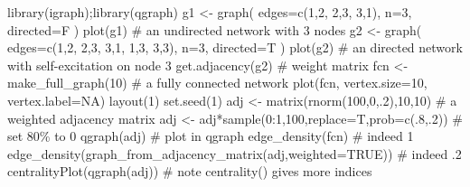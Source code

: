 \documentclass[
  a4paper,
  DIV=11,
  numbers=noendperiod]{scrreprt}
\newenvironment{Shaded}{\begin{snugshade}}{\end{snugshade}}
\newcommand{\AttributeTok}[1]{\textcolor[rgb]{0.40,0.45,0.13}{#1}}
\newcommand{\CommentTok}[1]{\textcolor[rgb]{0.37,0.37,0.37}{#1}}
\newcommand{\ConstantTok}[1]{\textcolor[rgb]{0.56,0.35,0.01}{#1}}
\newcommand{\DecValTok}[1]{\textcolor[rgb]{0.68,0.00,0.00}{#1}}
\newcommand{\FunctionTok}[1]{\textcolor[rgb]{0.28,0.35,0.67}{#1}}
\newcommand{\NormalTok}[1]{\textcolor[rgb]{0.00,0.23,0.31}{#1}}
\newcommand{\OtherTok}[1]{\textcolor[rgb]{0.00,0.23,0.31}{#1}}
\newcommand{\SpecialCharTok}[1]{\textcolor[rgb]{0.37,0.37,0.37}{#1}}
\begin{document}
\begin{Shaded}
\begin{Highlighting}[]
\FunctionTok{library}\NormalTok{(igraph);}\FunctionTok{library}\NormalTok{(qgraph)}
\NormalTok{g1 }\OtherTok{\textless{}{-}} \FunctionTok{graph}\NormalTok{( }\AttributeTok{edges=}\FunctionTok{c}\NormalTok{(}\DecValTok{1}\NormalTok{,}\DecValTok{2}\NormalTok{, }\DecValTok{2}\NormalTok{,}\DecValTok{3}\NormalTok{, }\DecValTok{3}\NormalTok{,}\DecValTok{1}\NormalTok{), }\AttributeTok{n=}\DecValTok{3}\NormalTok{, }\AttributeTok{directed=}\NormalTok{F ) }
\FunctionTok{plot}\NormalTok{(g1) }\CommentTok{\# an undirected network with 3 nodes}
\NormalTok{g2 }\OtherTok{\textless{}{-}} \FunctionTok{graph}\NormalTok{( }\AttributeTok{edges=}\FunctionTok{c}\NormalTok{(}\DecValTok{1}\NormalTok{,}\DecValTok{2}\NormalTok{, }\DecValTok{2}\NormalTok{,}\DecValTok{3}\NormalTok{, }\DecValTok{3}\NormalTok{,}\DecValTok{1}\NormalTok{, }\DecValTok{1}\NormalTok{,}\DecValTok{3}\NormalTok{, }\DecValTok{3}\NormalTok{,}\DecValTok{3}\NormalTok{), }\AttributeTok{n=}\DecValTok{3}\NormalTok{, }\AttributeTok{directed=}\NormalTok{T ) }
\FunctionTok{plot}\NormalTok{(g2) }\CommentTok{\# an directed network with self{-}excitation on node 3}
\FunctionTok{get.adjacency}\NormalTok{(g2) }\CommentTok{\# weight matrix}
\NormalTok{fcn }\OtherTok{\textless{}{-}} \FunctionTok{make\_full\_graph}\NormalTok{(}\DecValTok{10}\NormalTok{) }\CommentTok{\# a fully connected network}
\FunctionTok{plot}\NormalTok{(fcn, }\AttributeTok{vertex.size=}\DecValTok{10}\NormalTok{, }\AttributeTok{vertex.label=}\ConstantTok{NA}\NormalTok{)}
\FunctionTok{layout}\NormalTok{(}\DecValTok{1}\NormalTok{)}
\FunctionTok{set.seed}\NormalTok{(}\DecValTok{1}\NormalTok{)}
\NormalTok{adj }\OtherTok{\textless{}{-}} \FunctionTok{matrix}\NormalTok{(}\FunctionTok{rnorm}\NormalTok{(}\DecValTok{100}\NormalTok{,}\DecValTok{0}\NormalTok{,.}\DecValTok{2}\NormalTok{),}\DecValTok{10}\NormalTok{,}\DecValTok{10}\NormalTok{) }\CommentTok{\# a weighted adjacency matrix}
\NormalTok{adj }\OtherTok{\textless{}{-}}\NormalTok{ adj}\SpecialCharTok{*}\FunctionTok{sample}\NormalTok{(}\DecValTok{0}\SpecialCharTok{:}\DecValTok{1}\NormalTok{,}\DecValTok{100}\NormalTok{,}\AttributeTok{replace=}\NormalTok{T,}\AttributeTok{prob=}\FunctionTok{c}\NormalTok{(.}\DecValTok{8}\NormalTok{,.}\DecValTok{2}\NormalTok{)) }\CommentTok{\# set 80\% to 0}
\FunctionTok{qgraph}\NormalTok{(adj) }\CommentTok{\# plot in qgraph}
\FunctionTok{edge\_density}\NormalTok{(fcn) }\CommentTok{\# indeed 1}
\FunctionTok{edge\_density}\NormalTok{(}\FunctionTok{graph\_from\_adjacency\_matrix}\NormalTok{(adj,}\AttributeTok{weighted=}\ConstantTok{TRUE}\NormalTok{)) }\CommentTok{\# indeed .2}
\FunctionTok{centralityPlot}\NormalTok{(}\FunctionTok{qgraph}\NormalTok{(adj)) }\CommentTok{\# note centrality() gives more indices}
\end{Highlighting}
\end{Shaded}
\end{document}
